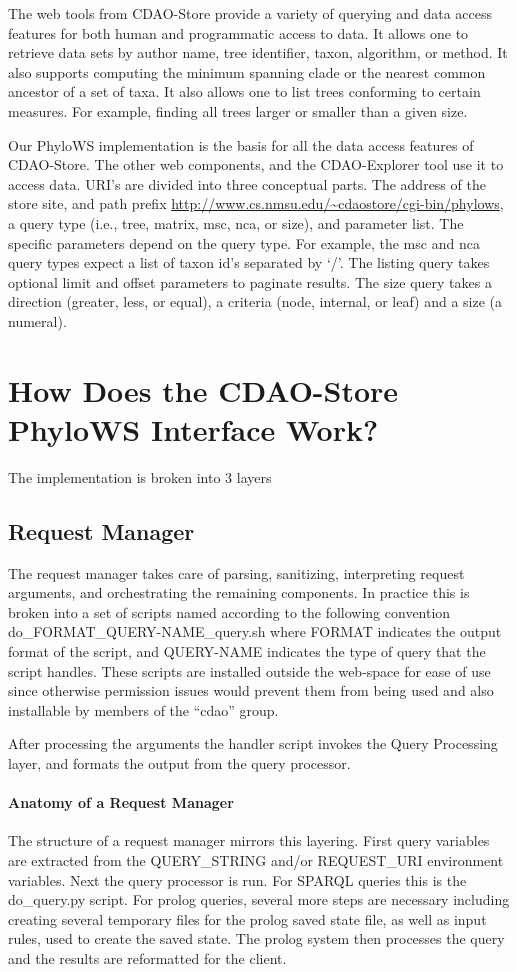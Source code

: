 \documentclass[10pt]{article}
\begin{document}
The web tools from CDAO-Store provide a variety of querying and data access
features for both human and programmatic access to data. It allows one to
retrieve data sets by author name, tree identifier, taxon, algorithm, or
method. It also supports computing the minimum spanning clade or the nearest
common ancestor of a set of taxa. It also allows one to list trees conforming
to certain measures. For example, finding all trees larger or smaller than a
given size. 

Our PhyloWS implementation is the basis for all the data access features of
CDAO-Store. The other web components, and the CDAO-Explorer tool use it to
access data. URI's are divided into three conceptual parts. The address of the
store site, and path prefix \url{http://www.cs.nmsu.edu/~cdaostore/cgi-bin/phylows}, a
query type (i.e., tree, matrix, msc, nca, or size), and parameter list. The
specific parameters depend on the query type. For example, the msc and nca
query types expect a list of taxon id's separated by `/'. The listing query
takes optional limit and offset parameters to paginate results. The size query
takes a direction (greater, less, or equal), a criteria (node, internal, or
leaf) and a size (a numeral).

\section{How Does the CDAO-Store PhyloWS Interface Work?}
The implementation is broken into 3 layers
  \subsection{Request Manager}
    The request manager takes care of parsing, sanitizing, interpreting request
arguments, and orchestrating  the remaining components.  In practice this is
broken into a set of scripts named according to the following convention
do\_FORMAT\_QUERY-NAME\_query.sh where FORMAT indicates the output format of
the script, and QUERY-NAME indicates the type of query that the script handles.
These scripts are installed outside the web-space for ease of use since
otherwise permission issues would prevent them from being used and also
installable by members of the ``cdao'' group.

     After processing the arguments the handler script invokes the Query
Processing layer, and formats the output from the query processor.

     \paragraph{Anatomy of a Request Manager}
      The structure of a request manager mirrors this layering. First query
variables are extracted from the QUERY\_STRING and/or REQUEST\_URI environment
variables.  Next the query processor is run. For SPARQL queries this is the
do\_query.py script. For prolog queries, several more steps are necessary
including creating several temporary files for the prolog saved state file, as
well as input rules, used to create the saved state. The prolog system then
processes the query and the results are reformatted for the client.
\end{document}
